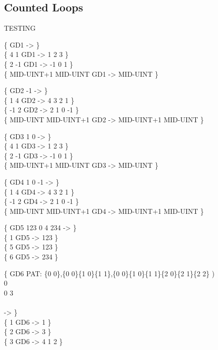 \subsection{Counted Loops}

\begin{tt}
TESTING        

\{ \word{:} GD1    \word{;} -> \} \\
\{          4        1 GD1 ->  1 2 3 \} \\
\{          2       -1 GD1 -> -1 0 1 \} \\
\{ MID-UINT+1 MID-UINT GD1 -> MID-UINT \}

\{ \word{:} GD2   -1  \word{;} -> \} \\
\{        1          4 GD2 -> 4 3 2 1 \} \\
\{       -1          2 GD2 -> 2 1 0 -1 \} \\
\{ MID-UINT MID-UINT+1 GD2 -> MID-UINT+1 MID-UINT \}

\{ \word{:} GD3  1 0     \word{;} -> \} \\
\{          4        1 GD3 -> 1 2 3    \} \\
\{          2       -1 GD3 -> -1 0 1   \} \\
\{ MID-UINT+1 MID-UINT GD3 -> MID-UINT \}

\{ \word{:} GD4  1 0    -1  \word{;} -> \} \\
\{        1          4 GD4 -> 4 3 2 1             \} \\
\{       -1          2 GD4 -> 2 1 0 -1            \} \\
\{ MID-UINT MID-UINT+1 GD4 -> MID-UINT+1 MID-UINT \}

\{ \word{:} GD5 123  0 
	 4    234   
	\word{;} -> \} \\
\{ 1 GD5 -> 123 \} \\
\{ 5 GD5 -> 123 \} \\
\{ 6 GD5 -> 234 \}

\{ \word{:} GD6  PAT: {\small \{0 0\},\{0 0\}\{1 0\}\{1 1\},\{0 0\}\{1 0\}\{1 1\}\{2 0\}\{2 1\}\{2 2\}} ) \\
	  0  \\
		\tab[3]   0 
				  \word{+} 3 \word{=} 
				\word{I} \word{UNLOOP}      \\
		\tab[2]  \\
	\tab	{} \word{;} -> \} \\
\{ 1 GD6 -> 1 \} \\
\{ 2 GD6 -> 3 \} \\
\{ 3 GD6 -> 4 1 2 \}
\end{tt}

